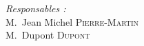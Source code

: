 \begin{titlepage}
\begin{center}
\begin{minipage}[t]{0.3\textwidth}
        \end{minipage}
        \begin{minipage}[t]{0.6\textwidth}
            \begin{flushright} \large
                \emph{Responsables :} \\
                M.~Jean Michel \textsc{Pierre-Martin} \\
                M.~Dupont \textsc{Dupont}
            \end{flushright}
        \end{minipage}
        \vfill
        {\large \reportdate}
    \end{center}
%
\end{titlepage}
